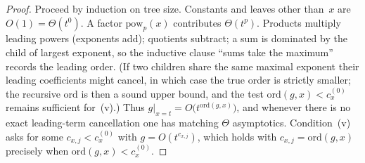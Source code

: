 \documentclass[11pt]{article}
\theoremstyle{plain}
\theoremstyle{remark}
\begin{document}
\begin{proof}
Proceed by induction on tree size.
Constants and leaves other than~$x$ are $O(1)=\Theta(t^{0})$.
A factor $\mathrm{pow}_p(x)$ contributes $\Theta(t^{p})$.
Products multiply leading powers (exponents add); quotients subtract; a sum is dominated by the child of largest exponent, so the inductive clause ``sums take the maximum'' records the leading order.
(If two children share the same maximal exponent their leading coefficients might cancel, in which case the true order is strictly smaller; the recursive $\mathrm{ord}$ is then a sound upper bound, and the test $\mathrm{ord}(g,x)<c_x^{(0)}$ remains sufficient for~(v).)
Thus $g|_{x=t}=O\bigl(t^{\mathrm{ord}(g,x)}\bigr)$, and whenever there is no exact leading-term cancellation one has matching $\Theta$ asymptotics.
Condition~(v) asks for some $c_{x,j}<c_x^{(0)}$ with $g=O(t^{c_{x,j}})$, which holds with $c_{x,j}=\mathrm{ord}(g,x)$ precisely when $\mathrm{ord}(g,x)<c_x^{(0)}$.
\end{proof}
\end{document}
